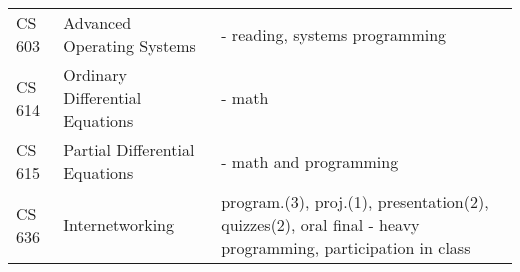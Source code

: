 \begin{table}[h]
\begin{tabular}{@{}lp{5cm}p{9cm}@{}}
		CS 603 & Advanced Operating Systems & - reading, systems programming \\
		CS 614 & Ordinary Differential Equations & - math \\
		CS 615 & Partial Differential Equations & - math and programming \\
		CS 636 & Internetworking & program.(3), proj.(1), presentation(2), quizzes(2), oral final - heavy programming, participation in class \\
		\bottomrule
	\end{tabular}
\end{table}


